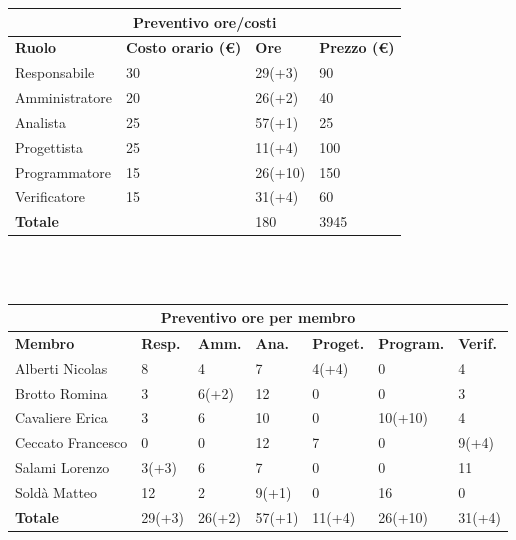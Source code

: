 \documentclass[a4paper, 12pt]{article}
\begin{document}
\begin{center}
	\begin{tabularx}{\textwidth}{|X|X|X|X|}
		\hline
		\multicolumn{4}{|c|}{\textbf{Preventivo ore/costi}}                                      \\
		\hline
		\hline
		\textbf{Ruolo}  & \textbf{Costo orario (\euro)} & \textbf{Ore} & \textbf{Prezzo (\euro)} \\
		\hline
		Responsabile    & 30                            & 29(+3)       & 90                      \\
		\hline
		Amministratore  & 20                            & 26(+2)       & 40                       \\
		\hline
		Analista        & 25                            & 57(+1)       & 25                       \\
		\hline
		Progettista     & 25                            & 11(+4)       & 100                     \\
		\hline
		Programmatore   & 15                            & 26(+10)       & 150                     \\
		\hline
		Verificatore    & 15                            & 31(+4)       & 60                      \\
		\hline
		\hline
		\textbf{Totale} &                               & 180         & 3945                   \\
		\hline
	\end{tabularx}\\[8pt]
	\mbox{}\\
\end{center}

\begin{center}
	\begin{tabularx}{\textwidth}{|X|X|X|X|X|X|X|}
		\hline
		\multicolumn{7}{|c|}{\textbf{Preventivo ore per membro}}                                      \\
		\hline
		\hline
		\textbf{Membro}  & \textbf{Resp.} & \textbf{Amm.} & \textbf{Ana.} &
		\textbf{Proget.} & \textbf{Program.} & \textbf{Verif.} \\
		\hline
		Alberti Nicolas    	&8 	&4	&7	&4(+4)	&0	&4	\\
		\hline
		Brotto Romina    	&3 	&6(+2)	&12	&0	&0	&3	\\
		\hline
		Cavaliere Erica    	&3 	&6  &10  &0 &10(+10) &4	\\
		\hline
		Ceccato Francesco   &0 	&0  &12  &7 &0 &9(+4)	\\
		\hline
		Salami Lorenzo    	&3(+3) 	&6  &7 &0 &0 &11	\\
		\hline
		Soldà Matteo    	&12	&2  &9(+1) &0 &16 &0	\\
		\hline
		\hline
		\textbf{Totale} 	&29(+3) &26(+2) &57(+1) &11(+4) &26(+10) &31(+4)	\\
		\hline
	\end{tabularx}\\[8pt]
	\mbox{}\\
\end{center}
\end{document}
